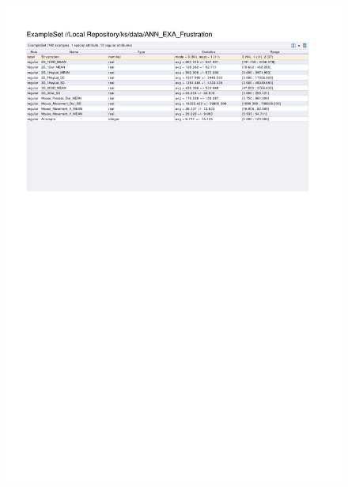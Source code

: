 \begin{figure}[htp]
  \centerline{\includegraphics[trim=0 620 0 60,clip,width=16.09cm]{results/ANN_EXA_Frustration.pdf}} \caption{
} \label{ANN_K_Frustration}
\end{figure}

